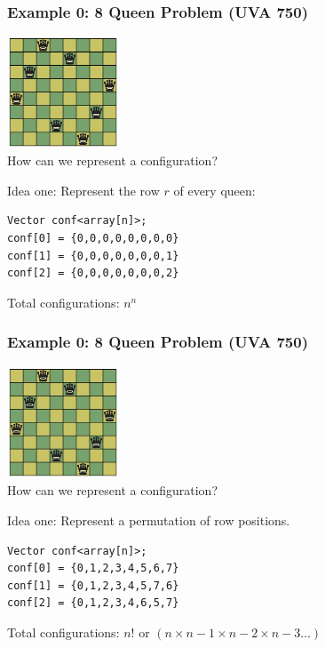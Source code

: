 \documentclass{beamer}
\begin{document}
\begin{frame}[fragile]
  \frametitle{Example 0: 8 Queen Problem (UVA 750)}

  \includegraphics[width=0.25\textwidth]{../img/8queen}\\

  How can we represent a configuration?

  \bigskip

  Idea one: Represent the row $r$ of every queen:

  \bigskip
  
\begin{verbatim}
Vector conf<array[n]>;
conf[0] = {0,0,0,0,0,0,0,0}
conf[1] = {0,0,0,0,0,0,0,1}
conf[2] = {0,0,0,0,0,0,0,2}
\end{verbatim}

Total configurations: $n^n$
\end{frame}

\begin{frame}[fragile]
  \frametitle{Example 0: 8 Queen Problem (UVA 750)}

  \includegraphics[width=0.25\textwidth]{../img/8queen}\\

  How can we represent a configuration?

  \bigskip

  Idea one: Represent a permutation of row positions.

  \bigskip
  
\begin{verbatim}
Vector conf<array[n]>;
conf[0] = {0,1,2,3,4,5,6,7}
conf[1] = {0,1,2,3,4,5,7,6}
conf[2] = {0,1,2,3,4,6,5,7}
\end{verbatim}

Total configurations: $n!$ or $(n\times n-1\times n-2\times n-3\ldots)$
\end{frame}
\end{document}
